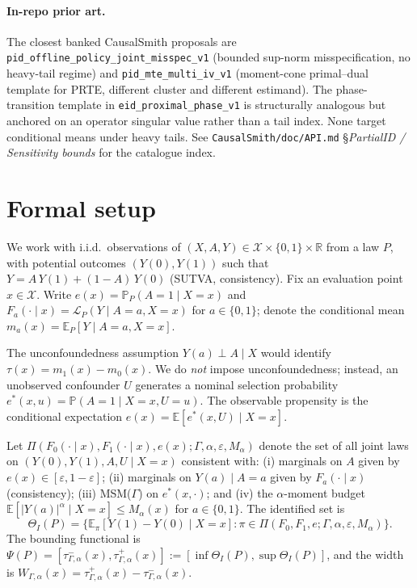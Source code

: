 \documentclass[11pt]{article}
\newcommand{\E}{\mathbb{E}}
\renewcommand{\Pr}{\mathbb{P}}
\newcommand{\R}{\mathbb{R}}
\theoremstyle{definition}
\theoremstyle{plain}
\theoremstyle{remark}
\begin{document}
\paragraph{In-repo prior art.}
The closest banked CausalSmith proposals are \texttt{pid\_offline\_policy\_joint\_misspec\_v1} (bounded sup-norm misspecification, no heavy-tail regime) and \texttt{pid\_mte\_multi\_iv\_v1} (moment-cone primal--dual template for PRTE, different cluster and different estimand). The phase-transition template in \texttt{eid\_proximal\_phase\_v1} is structurally analogous but anchored on an operator singular value rather than a tail index. None target conditional means under heavy tails. See \texttt{CausalSmith/doc/API.md} \S\textit{PartialID / Sensitivity bounds} for the catalogue index.

\section{Formal setup}

We work with i.i.d.\ observations of $(X, A, Y) \in \mathcal{X}\times\{0,1\}\times\R$ from a law $P$, with potential outcomes $(Y(0), Y(1))$ such that $Y = A\, Y(1) + (1-A)\, Y(0)$ (SUTVA, consistency). Fix an evaluation point $x\in\mathcal{X}$. Write $e(x) = \Pr_P(A=1\mid X=x)$ and $F_a(\cdot\mid x) = \mathcal{L}_P(Y\mid A=a, X=x)$ for $a\in\{0,1\}$; denote the conditional mean $m_a(x) = \E_P[Y\mid A=a, X=x]$.

The unconfoundedness assumption $Y(a) \perp A \mid X$ would identify $\tau(x) = m_1(x) - m_0(x)$. We do \emph{not} impose unconfoundedness; instead, an unobserved confounder $U$ generates a nominal selection probability $e^\ast(x,u) = \Pr(A=1\mid X=x, U=u)$. The observable propensity is the conditional expectation $e(x) = \E[e^\ast(x, U)\mid X=x]$.

Let $\Pi(F_0(\cdot\mid x), F_1(\cdot\mid x), e(x); \Gamma, \alpha, \varepsilon, M_\alpha)$ denote the set of all joint laws on $(Y(0), Y(1), A, U \mid X=x)$ consistent with: (i) marginals on $A$ given by $e(x)\in[\varepsilon, 1-\varepsilon]$; (ii) marginals on $Y(a)\mid A=a$ given by $F_a(\cdot\mid x)$ (consistency); (iii) MSM($\Gamma$) on $e^\ast(x, \cdot)$; and (iv) the $\alpha$-moment budget $\E[|Y(a)|^\alpha\mid X=x]\le M_\alpha(x)$ for $a\in\{0,1\}$. The identified set is
\[
  \Theta_I(P) = \big\{ \E_\pi[Y(1)-Y(0)\mid X=x] : \pi \in \Pi(F_0, F_1, e; \Gamma, \alpha, \varepsilon, M_\alpha)\big\}.
\]
The bounding functional is $\Psi(P) = [\tau^-_{\Gamma,\alpha}(x), \tau^+_{\Gamma,\alpha}(x)] := [\inf \Theta_I(P), \sup \Theta_I(P)]$, and the width is $W_{\Gamma,\alpha}(x) = \tau^+_{\Gamma,\alpha}(x) - \tau^-_{\Gamma,\alpha}(x)$.
\end{document}
